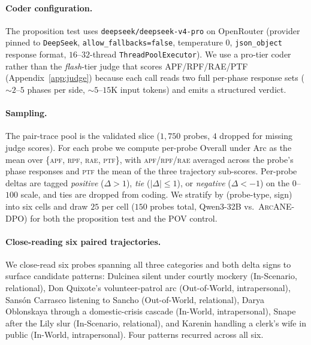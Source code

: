 \documentclass{llmxive}
\providecommand{\ours}{\textsc{ArcANE}}
\begin{document}
\paragraph{Coder configuration.} The proposition test uses \texttt{deepseek/deepseek-v4-pro} on OpenRouter (provider pinned to \texttt{DeepSeek}, \texttt{allow\_fallbacks=false}, temperature $0$, \texttt{json\_object} response format, $16$--$32$-thread \texttt{ThreadPoolExecutor}). We use a pro-tier coder rather than the \emph{flash}-tier judge that scores APF/RPF/RAE/PTF (Appendix~\ref{app:judge}) because each call reads two full per-phase response sets ($\sim$$2$--$5$ phases per side, $\sim$$5$--$15$K input tokens) and emits a structured verdict.

\paragraph{Sampling.}
The pair-trace pool is the validated slice ($1{,}750$ probes, $4$ dropped for missing judge scores). For each probe we compute per-probe Overall under Arc as the mean over \{\textsc{apf}, \textsc{rpf}, \textsc{rae}, \textsc{ptf}\}, with \textsc{apf}/\textsc{rpf}/\textsc{rae} averaged across the probe's phase responses and \textsc{ptf} the mean of the three trajectory sub-scores. Per-probe deltas are tagged \emph{positive} ($\Delta > 1$), \emph{tie} ($|\Delta| \leq 1$), or \emph{negative} ($\Delta < -1$) on the $0$--$100$ scale, and ties are dropped from coding. We stratify by (probe-type, sign) into six cells and draw $25$ per cell ($150$ probes total, Qwen3-32B vs.\ \ours{}-DPO) for both the proposition test and the POV control.

\paragraph{Close-reading six paired trajectories.}
We close-read six probes spanning all three categories and both delta signs to surface candidate patterns: Dulcinea silent under courtly mockery (In-Scenario, relational), Don Quixote's volunteer-patrol arc (Out-of-World, intrapersonal), Sansón Carrasco listening to Sancho (Out-of-World, relational), Darya Oblonskaya through a domestic-crisis cascade (In-World, intrapersonal), Snape after the Lily slur (In-Scenario, relational), and Karenin handling a clerk's wife in public (In-World, intrapersonal). Four patterns recurred across all six.
\end{document}
